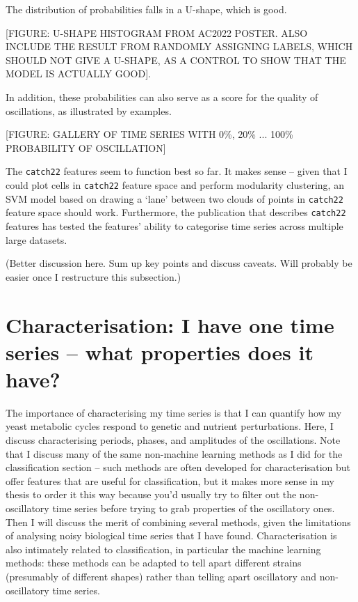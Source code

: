 The distribution of probabilities falls in a U-shape, which is good.

[FIGURE: U-SHAPE HISTOGRAM FROM AC2022 POSTER.  ALSO INCLUDE THE RESULT FROM RANDOMLY ASSIGNING LABELS, WHICH SHOULD NOT GIVE A U-SHAPE, AS A CONTROL TO SHOW THAT THE MODEL IS ACTUALLY GOOD].

In addition, these probabilities can also serve as a score for the quality of oscillations, as illustrated by examples.

[FIGURE: GALLERY OF TIME SERIES WITH 0\%, 20\% ... 100\% PROBABILITY OF OSCILLATION]

The \texttt{catch22} features seem to function best so far.
It makes sense -- given that I could plot cells in \texttt{catch22} feature space and perform modularity clustering, an SVM model based on drawing a `lane' between two clouds of points in \texttt{catch22} feature space should work.
Furthermore, the publication that describes \texttt{catch22} features \parencite{lubbaCatch22CAnonicalTimeseries2019} has tested the features' ability to categorise time series across multiple large datasets.

(Better discussion here.  Sum up key points and discuss caveats.  Will probably be easier once I restructure this subsection.)

\section{Characterisation: I have one time series -- what properties does it have?}
\label{sec:analysis-characterisation}

The importance of characterising my time series is that I can quantify how my yeast metabolic cycles respond to genetic and nutrient perturbations.
Here, I discuss characterising periods, phases, and amplitudes of the oscillations.
Note that I discuss many of the same non-machine learning methods as I did for the classification section -- such methods are often developed for characterisation but offer features that are useful for classification, but it makes more sense in my thesis to order it this way because you'd usually try to filter out the non-oscillatory time series before trying to grab properties of the oscillatory ones.
Then I will discuss the merit of combining several methods, given the limitations of analysing noisy biological time series that I have found.
Characterisation is also intimately related to classification, in particular the machine learning methods: these methods can be adapted to tell apart different strains (presumably of different shapes) rather than telling apart oscillatory and non-oscillatory time series.


